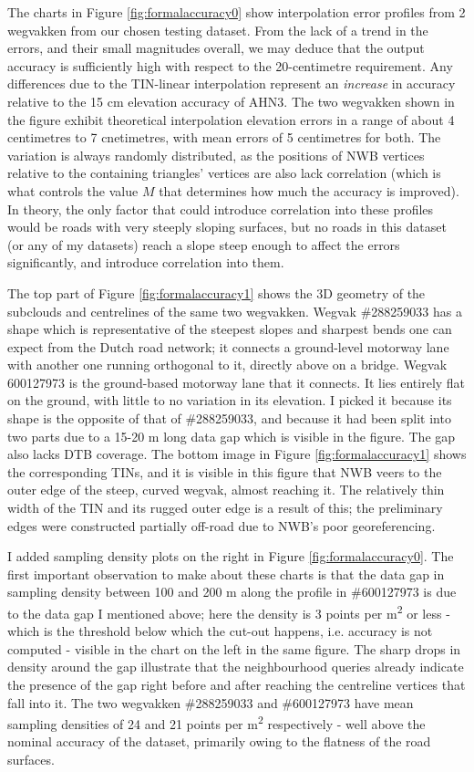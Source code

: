 The charts in Figure \ref{fig:formalaccuracy0} show interpolation error profiles from 2 wegvakken from our chosen testing dataset. From the lack of a trend in the errors, and their small magnitudes overall, we may deduce that the output accuracy is sufficiently high with respect to the 20-centimetre requirement. Any differences due to the TIN-linear interpolation represent an \textit{increase} in accuracy relative to the 15 cm elevation accuracy of AHN3. The two wegvakken shown in the figure exhibit theoretical interpolation elevation errors in a range of about 4 centimetres to 7 cnetimetres, with mean errors of 5 centimetres for both. The variation is always randomly distributed, as the positions of NWB vertices relative to the containing triangles' vertices are also lack correlation (which is what controls the value $M$ that determines how much the accuracy is improved). In theory, the only factor that could introduce correlation into these profiles would be roads with very steeply sloping surfaces, but no roads in this dataset (or any of my datasets) reach a slope steep enough to affect the errors significantly, and introduce correlation into them.

The top part of Figure \ref{fig:formalaccuracy1} shows the 3D geometry of the subclouds and centrelines of the same two wegvakken. Wegvak \#288259033 has a shape which is representative of the steepest slopes and sharpest bends one can expect from the Dutch road network; it connects a ground-level motorway lane with another one running orthogonal to it, directly above on a bridge. Wegvak 600127973 is the ground-based motorway lane that it connects. It lies entirely flat on the ground, with little to no variation in its elevation. I picked it because its shape is the opposite of that of \#288259033, and because it had been split into two parts due to a 15-20 m long data gap which is visible in the figure. The gap also lacks DTB coverage. The bottom image in Figure \ref{fig:formalaccuracy1} shows the corresponding TINs, and it is visible in this figure that NWB veers to the outer edge of the steep, curved wegvak, almost reaching it. The relatively thin width of the TIN and its rugged outer edge is a result of this; the preliminary edges were constructed partially off-road due to NWB's poor georeferencing.

I added sampling density plots on the right in Figure \ref{fig:formalaccuracy0}. The first important observation to make about these charts is that the data gap in sampling density between 100 and 200 m along the profile in \#600127973 is due to the data gap I mentioned above; here the density is 3 points per m\textsuperscript{2} or less - which is the threshold below which the cut-out happens, i.e. accuracy is not computed - visible in the chart on the left in the same figure. The sharp drops in density around the gap illustrate that the neighbourhood queries already indicate the presence of the gap right before and after reaching the centreline vertices that fall into it. The two wegvakken \#288259033 and \#600127973 have mean sampling densities of 24 and 21 points per m\textsuperscript{2} respectively - well above the nominal accuracy of the dataset, primarily owing to the flatness of the road surfaces.

